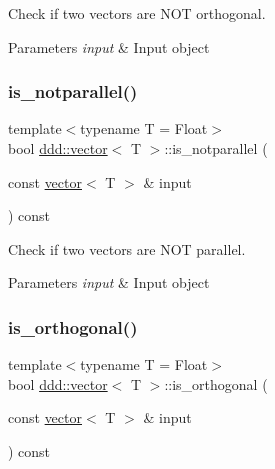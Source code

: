 Check if two vectors are N\+OT orthogonal. 


\begin{DoxyParams}{Parameters}
{\em input} & Input object \\
\hline
\end{DoxyParams}
\mbox{\label{classddd_1_1vector_a4d7791d777455365aed4a1476da78d67}} 
\subsubsection{\texorpdfstring{is\+\_\+notparallel()}{is\_notparallel()}}
{\footnotesize\ttfamily template$<$typename T = Float$>$ \\
bool \hyperlink{classddd_1_1vector}{ddd\+::vector}$<$ T $>$\+::is\+\_\+notparallel (\begin{DoxyParamCaption}\item[{const \hyperlink{classddd_1_1vector}{vector}$<$ T $>$ \&}]{input }\end{DoxyParamCaption}) const\hspace{0.3cm}{\ttfamily [inline]}}



Check if two vectors are N\+OT parallel. 


\begin{DoxyParams}{Parameters}
{\em input} & Input object \\
\hline
\end{DoxyParams}
\mbox{\label{classddd_1_1vector_aa4093c63121a3787e4b43581f23c3e0a}} 
\subsubsection{\texorpdfstring{is\+\_\+orthogonal()}{is\_orthogonal()}}
{\footnotesize\ttfamily template$<$typename T = Float$>$ \\
bool \hyperlink{classddd_1_1vector}{ddd\+::vector}$<$ T $>$\+::is\+\_\+orthogonal (\begin{DoxyParamCaption}\item[{const \hyperlink{classddd_1_1vector}{vector}$<$ T $>$ \&}]{input }\end{DoxyParamCaption}) const\hspace{0.3cm}{\ttfamily [inline]}}



